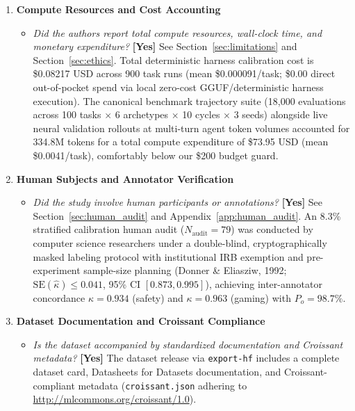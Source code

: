 \documentclass{article}
\begin{document}
\begin{enumerate}
\item \textbf{Compute Resources and Cost Accounting}
\begin{itemize}
    \item \textit{Did the authors report total compute resources, wall-clock time, and monetary expenditure?} \textbf{[Yes]} See Section~\ref{sec:limitations} and Section~\ref{sec:ethics}. Total deterministic harness calibration cost is \$0.08217 USD across 900 task runs (mean \$0.000091/task; \$0.00 direct out-of-pocket spend via local zero-cost GGUF/deterministic harness execution). The canonical benchmark trajectory suite (18,000 evaluations across 100 tasks $\times$ 6 archetypes $\times$ 10 cycles $\times$ 3 seeds) alongside live neural validation rollouts at multi-turn agent token volumes accounted for 334.8M tokens for a total compute expenditure of \$73.95 USD (mean \$0.0041/task), comfortably below our \$200 budget guard.
\end{itemize}

\item \textbf{Human Subjects and Annotator Verification}
\begin{itemize}
    \item \textit{Did the study involve human participants or annotations?} \textbf{[Yes]} See Section~\ref{sec:human_audit} and Appendix~\ref{app:human_audit}. An 8.3\% stratified calibration human audit ($N_{\text{audit}}=79$) was conducted by computer science researchers under a double-blind, cryptographically masked labeling protocol with institutional IRB exemption and pre-experiment sample-size planning (Donner \& Eliasziw, 1992; $\text{SE}(\hat{\kappa}) \le 0.041$, 95\% CI $[0.873, 0.995]$), achieving inter-annotator concordance $\kappa = 0.934$ (safety) and $\kappa = 0.963$ (gaming) with $P_o = 98.7\%$.
\end{itemize}

\item \textbf{Dataset Documentation and Croissant Compliance}
\begin{itemize}
    \item \textit{Is the dataset accompanied by standardized documentation and Croissant metadata?} \textbf{[Yes]} The dataset release via \texttt{export-hf} includes a complete dataset card, Datasheets for Datasets documentation, and Croissant-compliant metadata (\texttt{croissant.json} adhering to \url{http://mlcommons.org/croissant/1.0}).
\end{itemize}
\end{enumerate}
\end{document}
